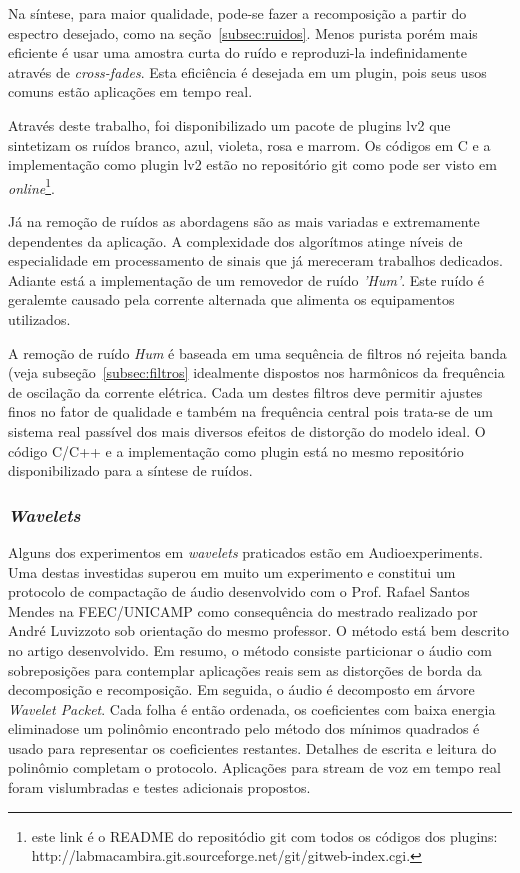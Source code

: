 Na síntese, para maior qualidade, 
pode-se fazer a recomposição a partir do espectro desejado, como na seção~\ref{subsec:ruidos}.
Menos purista porém mais eficiente é
usar uma amostra curta do ruído e reproduzi-la indefinidamente
através de \emph{cross-fades}. Esta eficiência é desejada em um plugin,
pois seus usos comuns estão aplicações em tempo real.

Através deste trabalho, foi disponibilizado um pacote de plugins lv2
que sintetizam os ruídos branco, azul, violeta, rosa e marrom. Os
  códigos em C e a implementação como plugin lv2 estão no
  repositório git como pode ser visto em \emph{online}\footnote{
      este link é o README do repositódio git com todos os códigos dos
      plugins:
  http://labmacambira.git.sourceforge.net/git/gitweb-index.cgi.}.

Já na remoção de ruídos as abordagens são as mais variadas e
extremamente dependentes da aplicação. A complexidade dos algorítmos
atinge níveis de especialidade em processamento de sinais que já
mereceram trabalhos dedicados. Adiante está a implementação de um
removedor de ruído \emph{'Hum'}. Este ruído é
geralemte causado pela corrente alternada que
alimenta os equipamentos utilizados.

A remoção de ruído \emph{Hum} é baseada em uma sequência de filtros nó rejeita
banda (veja subseção~\ref{subsec:filtros}
idealmente dispostos nos harmônicos da frequência de
oscilação da corrente elétrica. Cada um destes filtros deve permitir
ajustes finos no fator de qualidade e também na frequência central
pois trata-se de um sistema real passível dos mais diversos efeitos de
distorção do modelo ideal. O código C/C++ e a
implementação como plugin está no mesmo repositório disponibilizado
para a síntese de ruídos.


\subsubsection{\emph{Wavelets}}
Alguns dos experimentos em \emph{wavelets} praticados estão em
Audioexperiments.\cite{Audioexperiments} Uma destas investidas
superou em muito um experimento e constitui um protocolo de compactação de áudio desenvolvido com o Prof. Rafael Santos Mendes na FEEC/UNICAMP como consequência do mestrado realizado por André Luvizzoto sob orientação do mesmo professor.
O método está bem descrito no artigo desenvolvido. Em resumo, o método consiste particionar o áudio com sobreposições para contemplar aplicações reais sem as distorções de borda da decomposição e recomposição. Em seguida, o áudio é decomposto em árvore \emph{Wavelet Packet}. Cada folha é então ordenada, os coeficientes com baixa energia eliminadose um polinômio encontrado pelo método dos mínimos quadrados é usado para representar os coeficientes restantes. Detalhes de escrita e leitura do polinômio completam o protocolo. Aplicações para stream de voz em tempo real foram vislumbradas e testes adicionais propostos.\cite{FabbriWavelets}

